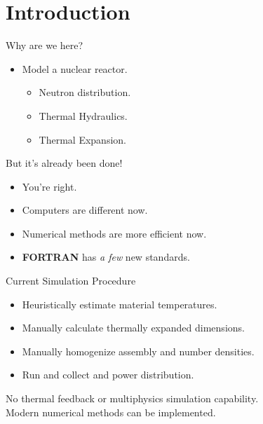 \section{Introduction}
\label{sec:introduction}

\begin{frame}{Why are we here?}
  \pause
  \begin{itemize}
    \item {\huge Model a nuclear reactor.}
      \pause
      \begin{itemize}
        \item Neutron distribution.
        \item Thermal Hydraulics.
        \item Thermal Expansion.
      \end{itemize}
  \end{itemize}
\end{frame}

\begin{frame}{But it's already been done!}
  \begin{itemize}
    \pause 
    \item You're right.
    \pause
    \item Computers are different now.
    \item Numerical methods are more efficient now.
    \item \textbf{FORTRAN} has \textit{a few} new standards.
  \end{itemize}
\end{frame}

\begin{frame}{Current Simulation Procedure}
  \begin{itemize}
    \item Heuristically estimate material temperatures.
    \item Manually calculate thermally expanded dimensions.
    \item Manually homogenize assembly and number densities.
    \item Run \dif and collect \keff and power distribution.
    \pause
  \end{itemize}
  \vspace{0.3in}
  \begin{block}{}
    \centering
    No thermal feedback or multiphysics simulation capability.\\
    Modern numerical methods can be implemented.
  \end{block}
\end{frame}


